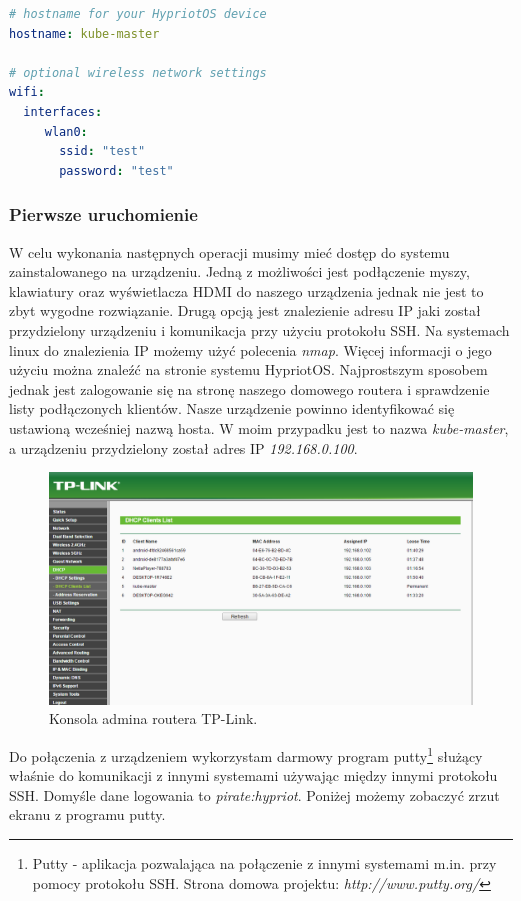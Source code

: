 \documentclass[12pt]{report}
\let\Oldsubsubsection\subsubsection
\renewcommand{\subsubsection}{\FloatBarrier\Oldsubsubsection}
\begin{document}
{\begin{lstlisting}[language=yaml]
# hostname for your HypriotOS device
hostname: kube-master

# optional wireless network settings
wifi:
  interfaces:
     wlan0:
       ssid: "test"
       password: "test"
\end{lstlisting}

\subsubsection{Pierwsze uruchomienie}
W celu wykonania następnych operacji musimy mieć dostęp do systemu zainstalowanego na urządzeniu. Jedną z możliwości jest podłączenie myszy, klawiatury oraz wyświetlacza HDMI do naszego urządzenia jednak nie jest to zbyt wygodne rozwiązanie. Drugą opcją jest znalezienie adresu IP jaki został przydzielony urzą\-dzeniu i komunikacja przy użyciu protokołu SSH. Na systemach linux do znalezienia IP możemy użyć polecenia \textit{nmap}. Więcej informacji o jego użyciu można znaleźć na stronie systemu HypriotOS. Najprostszym sposobem jednak jest zalogowanie się na stronę naszego domowego routera i sprawdzenie listy podłączonych klientów. Nasze urządzenie powinno identyfikować się ustawioną wcześniej nazwą hosta. W moim przypadku jest to nazwa \textit{kube-master}, a urządzeniu przydzielony został adres IP \textit{192.168.0.100}.

\begin{figure}[h]
	\centering
	\includegraphics[width=1\textwidth]{images/tp-link-console.png}
	\caption{Konsola admina routera TP-Link.}
\end{figure}
\FloatBarrier

Do połączenia z urządzeniem wykorzystam darmowy program putty\footnote{Putty - aplikacja pozwalająca na połączenie z innymi systemami m.in. przy pomocy protokołu SSH. Strona domowa projektu: \textit{http://www.putty.org/}} służący właśnie do komunikacji z innymi systemami używając między innymi protokołu SSH. Domyśle dane logowania to \textit{pirate:hypriot}. Poniżej możemy zobaczyć zrzut ekranu z programu putty.

}
\end{document}
